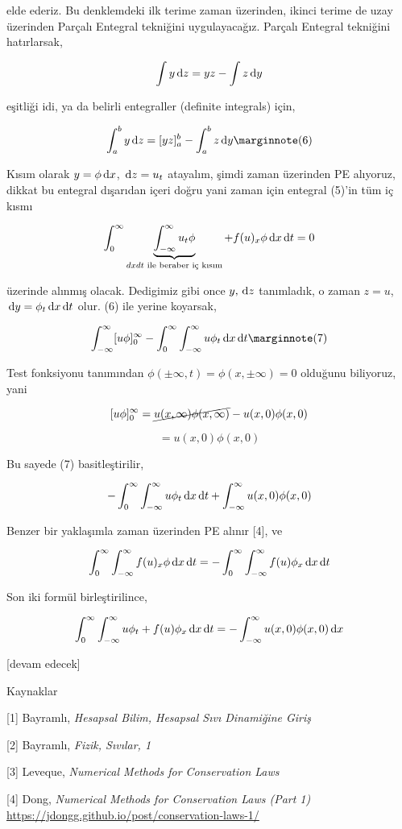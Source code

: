 \documentclass[12pt,fleqn]{article}\usepackage{../../common}
\begin{document}
elde ederiz. Bu denklemdeki ilk terime zaman üzerinden, ikinci terime de uzay
üzerinden Parçalı Entegral tekniğini uygulayacağız. Parçalı Entegral tekniğini
hatırlarsak,

$$
\int y \,\mathrm{d} z = y z - \int z \,\mathrm{d} y
$$

eşitliği idi, ya da belirli entegraller (definite integrals) için,

$$
\int_{a}^{b} y \ud z = [y z]_{a}^{b} - \int_{a}^{b} z \ud y
\mlabel{6}
$$

Kısım olarak $y = \phi \,\mathrm{d} x$, $\,\mathrm{d} z = u_t$ atayalım, şimdi zaman üzerinden PE
alıyoruz, dikkat bu entegral dışarıdan içeri doğru yani zaman için entegral
(5)'in tüm iç kısmı

$$
\int _{0}^{\infty}
\underbrace{\int _{-\infty}^{\infty} u_t \phi}_{dx dt\textrm{ ile beraber iç kısım}} + f(u)_x \phi \,\mathrm{d} x
\,\mathrm{d} t = 0
$$

üzerinde alınmış olacak. Dedigimiz gibi once $y,\,\mathrm{d} z$ tanımladık, o zaman $z=u$,
$\,\mathrm{d} y = \phi_t \,\mathrm{d} x \,\mathrm{d} t$ olur. (6) ile yerine koyarsak,

$$
\int_{-\infty}^{\infty} [ u \phi ]_{0}^{\infty} -
\int _{0}^{\infty} \int_{-\infty}^{\infty} u \phi_t \ud x \ud t
\mlabel{7}
$$

Test fonksiyonu tanımından $\phi(\pm \infty, t) = \phi(x, \pm \infty) = 0$
olduğunu biliyoruz, yani

$$
[ u \phi ]_{0}^{\infty} = \cancel{u(x,\infty)\phi(x,\infty)} - u(x,0)\phi(x,0) 
$$

$$
= u(x,0)\phi(x,0) 
$$

Bu sayede (7) basitleştirilir,

$$
- \int _{0}^{\infty} \int_{-\infty}^{\infty} u \phi_t \,\mathrm{d} x \,\mathrm{d} t +
\int_{-\infty}^{\infty} u(x,0)\phi(x,0) 
$$

Benzer bir yaklaşımla zaman üzerinden PE alınır [4], ve

$$
\int_{0}^{\infty} \int_{-\infty}^{\infty}
f(u)_x \phi \,\mathrm{d} x \,\mathrm{d} t =
- \int_{0}^{\infty} \int_{-\infty}^{\infty} f(u) \phi_x \,\mathrm{d} x \,\mathrm{d} t
$$

Son iki formül birleştirilince,

$$
\int_{0}^{\infty} \int_{-\infty}^{\infty}
u \phi_t + f(u) \phi_x \,\mathrm{d} x \,\mathrm{d} t = -
\int_{-\infty}^{\infty} u(x,0) \phi(x,0) \,\mathrm{d} x 
$$


[devam edecek]

Kaynaklar

[1] Bayramlı, {\em Hesapsal Bilim, Hesapsal Sıvı Dinamiğine Giriş}

[2] Bayramlı, {\em Fizik, Sıvılar, 1}

[3] Leveque, {\em Numerical Methods for Conservation Laws}

[4] Dong, {\em Numerical Methods for Conservation Laws (Part 1)}
    \url{https://jdongg.github.io/post/conservation-laws-1/}
\end{document}
